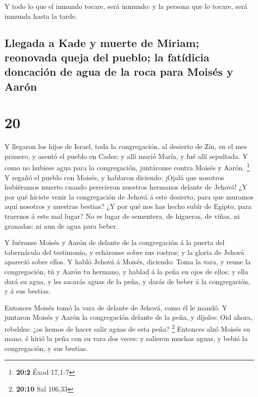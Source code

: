  Y todo lo que el inmundo tocare, será inmundo: y la
persona que lo tocare, será inmunda hasta la tarde.

\hypertarget{llegada-a-kade-y-muerte-de-miriam-reonovada-queja-del-pueblo-la-fatuxeddicia-doncaciuxf3n-de-agua-de-la-roca-para-moisuxe9s-y-aaruxf3n}{%
\subsection{Llegada a Kade y muerte de Miriam; reonovada queja del
pueblo; la fatídicia doncación de agua de la roca para Moisés y
Aarón}\label{llegada-a-kade-y-muerte-de-miriam-reonovada-queja-del-pueblo-la-fatuxeddicia-doncaciuxf3n-de-agua-de-la-roca-para-moisuxe9s-y-aaruxf3n}}

\hypertarget{section-19}{%
\section{20}\label{section-19}}

 Y llegaron los hijos de Israel, toda la congregación, al
desierto de Zin, en el mes primero, y asentó el pueblo en Cades; y allí
murió María, y fué allí sepultada.  Y como no hubiese agua
para la congregación, juntáronse contra Moisés y Aarón. \footnote{\textbf{20:2}
  Éxod 17,1-7}  Y regañó el pueblo con Moisés, y hablaron
diciendo: ¡Ojalá que nosotros hubiéramos muerto cuando perecieron
nuestros hermanos delante de Jehová!  ¿Y por qué hiciste
venir la congregación de Jehová á este desierto, para que muramos aquí
nosotros y nuestras bestias?  ¿Y por qué nos has hecho
subir de Egipto, para traernos á este mal lugar? No es lugar de
sementera, de higueras, de viñas, ni granadas: ni aun de agua para
beber.

 Y fuéronse Moisés y Aarón de delante de la congregación á
la puerta del tabernáculo del testimonio, y echáronse sobre sus rostros;
y la gloria de Jehová apareció sobre ellos.  Y habló
Jehová á Moisés, diciendo:  Toma la vara, y reune la
congregación, tú y Aarón tu hermano, y hablad á la peña en ojos de
ellos; y ella dará su agua, y les sacarás aguas de la peña, y darás de
beber á la congregación, y á sus bestias.

 Entonces Moisés tomó la vara de delante de Jehová, como
él le mandó.  Y juntaron Moisés y Aarón la congregación
delante de la peña, y díjoles: Oid ahora, rebeldes: ¿os hemos de hacer
salir aguas de esta peña? \footnote{\textbf{20:10} Sal 106,33}
 Entonces alzó Moisés su mano, é hirió la peña con su
vara dos veces: y salieron muchas aguas, y bebió la congregación, y sus
bestias.

